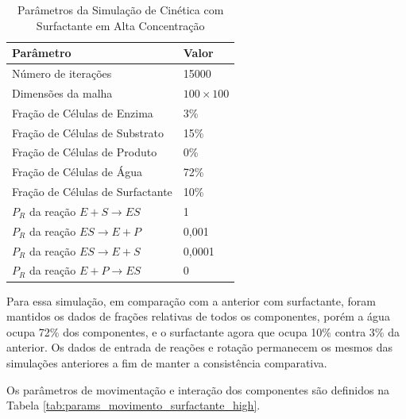 \documentclass[12pt,oneside]{report}
\begin{document}
\begin{table}[H]
    \centering
    \caption{Parâmetros da Simulação de Cinética com Surfactante em Alta Concentração}
    \vspace{0.2cm}
    \begin{tabularx}{\textwidth}{X m{5cm}}
        \hline
        \textbf{Parâmetro}                     & \textbf{Valor}   \\
        \hline
        Número de iterações                    & 15000            \\
        Dimensões da malha                     & $100 \times 100$ \\
        Fração de Células de Enzima            & 3\%              \\
        Fração de Células de Substrato         & 15\%             \\
        Fração de Células de Produto           & 0\%              \\
        Fração de Células de Água              & 72\%             \\
        Fração de Células de Surfactante       & 10\%             \\
        $P_R$ da reação $E + S \rightarrow ES$ & 1                \\
        $P_R$ da reação $ES \rightarrow E + P$ & 0{,}001          \\
        $P_R$ da reação $ES \rightarrow E + S$ & 0{,}0001         \\
        $P_R$ da reação $E + P \rightarrow ES$ & 0                \\
        \hline
    \end{tabularx}
    \vspace{0.2cm}
    \label{tab:params_apolar_surfactante_high}
\end{table}

Para essa simulação, em comparação com a anterior com surfactante, foram mantidos os dados de frações relativas de todos os componentes, porém a água ocupa 72\% dos componentes, e o surfactante agora que ocupa 10\% contra 3\% da anterior. Os dados de entrada de reações e rotação permanecem os mesmos das simulações anteriores a fim de manter a consistência comparativa.

Os parâmetros de movimentação e interação dos componentes são definidos na Tabela \ref{tab:params_movimento_surfactante_high}.
\end{document}
